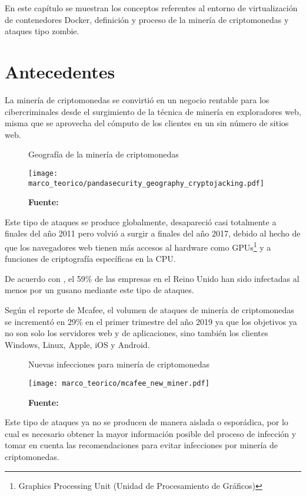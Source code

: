 \documentclass[../main/main.tex]{subfiles}
\begin{document}
\espacio
  En este capítulo se muestran los conceptos referentes al entorno de virtualización de contenedores Docker, definición y proceso de la minería de criptomonedas y ataques tipo zombie.

  \section{Antecedentes}

  La minería de criptomonedas se convirtió en un negocio rentable para los cibercriminales desde el surgimiento de la técnica de minería en exploradores web, misma que se aprovecha del cómputo de los clientes en un sin número de sitios web.

  \begin{figure}[H]
    \centering
    \caption{Geografía de la minería de criptomonedas}
    \texttt{[image: marco\_teorico/pandasecurity\_geography\_cryptojacking.pdf]}
    \caption*{\textbf{Fuente:} \cite{report:pandasecurity_coinhive_mining}}
  \end{figure}

  Este tipo de ataques se produce globalmente, desapareció casi totalmente a finales del año 2011 pero volvió a surgir a finales del año 2017, debido al hecho de que los navegadores web tienen más accesos al hardware como GPUs\footnote{Graphics Processing Unit (Unidad de Procesamiento de Gráficos)} y a funciones de criptografía específicas en la CPU.

  De acuerdo con \cite[p.~13]{report:pandasecurity_coinhive_mining}, el 59\% de las empresas en el Reino Unido han sido infectadas al menos por un gusano mediante este tipo de ataques.

  Según el reporte \cite[p.~22]{report:mcafee_threats} de Mcafee, el volumen de ataques de minería de criptomonedas se incrementó en 29\% en el primer trimestre del año 2019 ya que los objetivos ya no son solo los servidores web y de aplicaciones, sino también los clientes Windows, Linux, Apple, iOS y Android.

  \begin{figure}[ht]
    \centering
    \caption{Nuevas infecciones para minería de criptomonedas}
    \texttt{[image: marco\_teorico/mcafee\_new\_miner.pdf]}
    \caption*{\textbf{Fuente:} \cite{report:mcafee_threats}}
  \end{figure}

  Este tipo de ataques ya no se producen de manera aislada o esporádica, por lo cual es necesario obtener la mayor información posible del proceso de infección y tomar en cuenta las recomendaciones para evitar infecciones por minería de criptomonedas.
\end{document}
